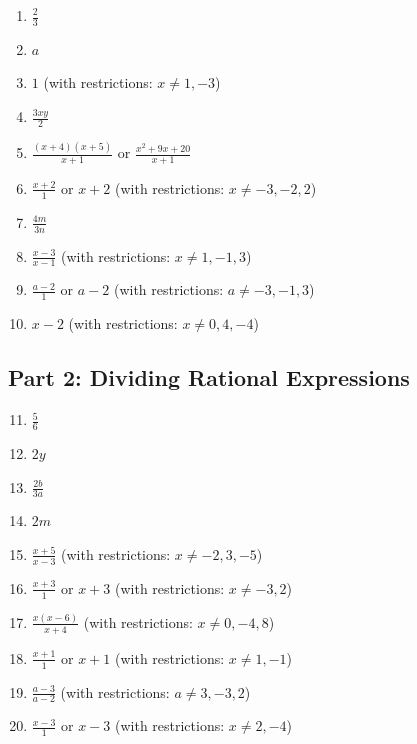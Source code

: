 \documentclass[12pt]{article}
\begin{document}
\begin{enumerate}

\item $\frac{2}{3}$

\item $a$

\item $1$ (with restrictions: $x \neq 1, -3$)

\item $\frac{3xy}{2}$

\item $\frac{(x+4)(x+5)}{x+1}$ or $\frac{x^2+9x+20}{x+1}$

\item $\frac{x+2}{1}$ or $x+2$ (with restrictions: $x \neq -3, -2, 2$)

\item $\frac{4m}{3n}$

\item $\frac{x-3}{x-1}$ (with restrictions: $x \neq 1, -1, 3$)

\item $\frac{a-2}{1}$ or $a-2$ (with restrictions: $a \neq -3, -1, 3$)

\item $x-2$ (with restrictions: $x \neq 0, 4, -4$)

\end{enumerate}

\subsection*{Part 2: Dividing Rational Expressions}

\begin{enumerate}
\setcounter{enumi}{10}

\item $\frac{5}{6}$

\item $2y$

\item $\frac{2b}{3a}$

\item $2m$

\item $\frac{x+5}{x-3}$ (with restrictions: $x \neq -2, 3, -5$)

\item $\frac{x+3}{1}$ or $x+3$ (with restrictions: $x \neq -3, 2$)

\item $\frac{x(x-6)}{x+4}$ (with restrictions: $x \neq 0, -4, 8$)

\item $\frac{x+1}{1}$ or $x+1$ (with restrictions: $x \neq 1, -1$)

\item $\frac{a-3}{a-2}$ (with restrictions: $a \neq 3, -3, 2$)

\item $\frac{x-3}{1}$ or $x-3$ (with restrictions: $x \neq 2, -4$)

\end{enumerate}
\end{document}
